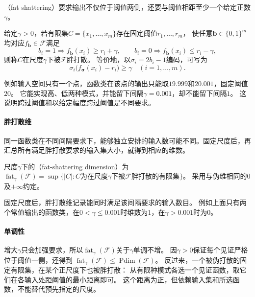 （fat shattering）要求输出不仅位于阈值两侧，还要与阈值相距至少一个给定正数$\gamma$。
\begin{definition}[胖打散]
\label{def:fat-shattering}
给定$\gamma>0$，若有限集$C=\{x_1,\ldots,x_m\}$存在固定阈值$r_1,\ldots,r_m$，
使任意$\bm b\in\{0,1\}^m$均对应$f_{\bm b}\in\mathcal F$满足
\begin{equation}
 b_i=1\Rightarrow f_{\bm b}(x_i)\geq r_i+\gamma,\qquad
 b_i=0\Rightarrow f_{\bm b}(x_i)\leq r_i-\gamma,
 \label{eq:fat-shattering}
\end{equation}
则称$C$在尺度$\gamma$下被$\mathcal F$胖打散。
等价地，以$\sigma_i=2b_i-1$编码，可写为
\begin{equation}
 \sigma_i\bigl(f_{\bm\sigma}(x_i)-r_i\bigr)\geq\gamma
 \quad(i=1,\ldots,m).
 \label{eq:functional-fat-shattering}
\end{equation}
\end{definition}

例如输入空间只有一个点，函数类在该点的输出只能取$19.999$和$20.001$，固定阈值$20$。
它能实现高、低两种模式，并能留下间隔$\gamma=0.001$，却不能留下间隔$1$。
这说明跨过阈值和以给定幅度跨过阈值是不同要求。

\paragraph{胖打散维}

同一函数类在不同间隔要求下，能够独立安排的输入数可能不同。固定尺度后，再汇总所有满足胖打散要求的输入集大小，就得到相应的维数。

\begin{definition}[胖打散维]
\label{def:fat-shattering-dimension}
尺度$\gamma$下的（fat-shattering dimension）为
$\operatorname{fat}_\gamma(\mathcal F)=
\sup\{|C|:C\text{为在尺度}\gamma\text{下被}\mathcal F\text{胖打散的有限集}\}$。
采用与伪维相同的$0$及$+\infty$约定。
\end{definition}

固定尺度后，胖打散维记录能同时满足该间隔要求的输入数目。
例如上面只有两个常值输出的函数类，在$0<\gamma\leq0.001$时维数为$1$，在$\gamma>0.001$时为$0$。

\paragraph{单调性}

增大$\gamma$只会加强要求，所以$\operatorname{fat}_\gamma(\mathcal F)$关于$\gamma$单调不增。
因$\gamma>0$保证每个见证严格位于阈值一侧，还得到
$\operatorname{fat}_\gamma(\mathcal F)\leq\operatorname{Pdim}(\mathcal F)$。
反过来，一个被伪打散的固定有限集，在某个正尺度下也被胖打散：
从有限种模式各选一个见证函数，取它们在各输入处距阈值的最小距离即可。
这个距离为正，但依赖输入集和所选函数，不能替代预先指定的尺度。

